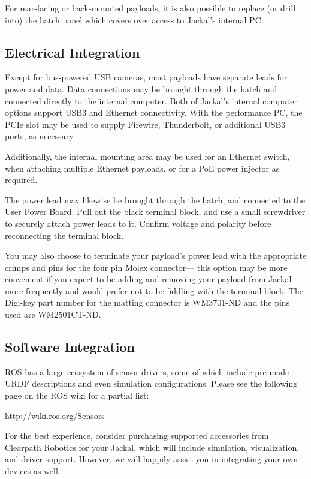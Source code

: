 \documentclass[]{clearpath-latex/clearpath-manual}
\begin{document}
For rear-facing or back-mounted payloads, it is also possible to replace (or drill into) the
hatch panel which covers over access to Jackal's internal PC.

\subsection{Electrical Integration}\label{payload-elec}

Except for bus-powered USB cameras, most payloads have separate leads for power and data. Data
connections may be brought through the hatch and connected directly to the internal computer. Both
of Jackal's internal computer options support USB3 and Ethernet connectivity. With the performance
PC, the PCIe slot may be used to supply Firewire, Thunderbolt, or additional USB3 ports, as necessary.

Additionally, the internal mounting area may be used for an Ethernet switch, when attaching multiple
Ethernet payloads, or for a PoE power injector as required.

The power lead may likewise be brought through the hatch, and connected to the User Power Board. Pull
out the black terminal block, and use a small screwdriver to securely attach power leads to it.
Confirm voltage and polarity before reconnecting the terminal block.

You may also choose to terminate your payload's power lead with the appropriate crimps and pins
for the four pin Molex connector--- this option may be more convenient if you expect to be adding
and removing your payload from Jackal more frequently and would prefer not to be fiddling with the
terminal block. The Digi-key part number for the matting connector is WM3701-ND and the pins used are WM2501CT-ND.


\subsection{Software Integration}

ROS has a large ecosystem of sensor drivers, some of which include pre-made URDF descriptions and
even simulation configurations. Please see the following page on the ROS wiki for a partial list:

\url{http://wiki.ros.org/Sensors}

For the best experience, consider purchasing supported accessories from Clearpath Robotics for your
Jackal, which will include simulation, visualization, and driver support. However, we will happily
assist you in integrating your own devices as well.
\end{document}
